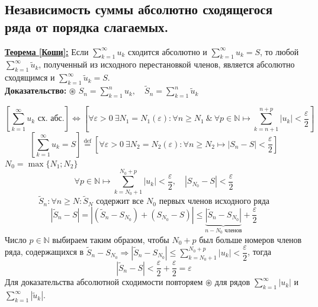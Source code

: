 \documentclass[a4paper,12pt]{article} %
\newcommand{\eqdef}{\stackrel{\mathrm{def}}{=}}
\newcommand{\N}{\mathbb{N}}
\newcommand{\useries}{\sum\limits_{k=1}^{\infty} u_k}
\newcommand{\auseries}{\sum\limits_{k=1}^{\infty} |u_k|}
\newcommand{\sn}{\sum\limits_{k=1}^{n} u_k}
\begin{document}
\subsection{Независимость суммы абсолютно сходящегося ряда от порядка слагаемых.}
\underline{\textbf{Теорема [Коши]:}}
Если $\useries$ сходится абсолютно и $\useries = S$, то любой $\sum\limits_{k=1}^{\infty} \tilde{u}_k$, полученный из исходного перестановкой членов, является абсолютно сходящимся и $\sum\limits_{k=1}^{\infty} \tilde{u}_k = S$.\\
\textbf{Доказательство:}
$\circledast$ $S_n = \sn, \hspace{1em} \tilde{S}_n = \sum\limits_{k=1}^{n} \tilde{u}_k$

\[\left[ \useries \text{ сх. абс.} \right] \Leftrightarrow \left[ \forall \varepsilon > 0 \ \exists N_1 = N_1(\varepsilon): \forall n \geqslant N_1 \ \& \ \forall p \in \N \mapsto \sum\limits_{k = n+1}^{n+p}|u_k| < \dfrac{\varepsilon}{2} \right] \]
\[ \left[ \useries = S \right] \eqdef \left[ \forall \varepsilon > 0 \ \exists N_2 = N_2(\varepsilon): \forall n \geqslant N_2 \mapsto \left| S_n - S \right| < \dfrac{\varepsilon}{2} \right] \]
$N_0 = \max \{ N_1; N_2 \}$
\[ \forall p \in \N \mapsto \sum\limits_{k = N_0 + 1}^{N_0 + p} |u_k| < \dfrac{\varepsilon}{2}, \hspace{1em} \left| S_{N_0} - S \right| < \dfrac{\varepsilon}{2} \]
\[\tilde{S}_n: \forall n \geqslant N: \tilde{S}_N \text{ содержит все } N_0 \text{ первых членов исходного ряда} \]
\[ |\tilde{S}_n - S| = |(\tilde{S}_n - S_{N_0}) + (S_{N_0} - S)| \leqslant \underbrace{|\tilde{S}_n - S_{N_0}|}_{n - N_0 \text{ членов}} + \dfrac{\varepsilon}{2} \]
Число $p \in \N$ выбираем таким образом, чтобы $N_0 + p$ был больше номеров членов ряда, содержащихся в $\tilde{S}_n - S_{N_0} \Rightarrow |\tilde{S}_n - S_{N_0}| \leqslant \sum\limits_{k=N_0 + 1}^{N_0 + p} |u_k| < \dfrac{\varepsilon}{2}$, тогда
\[ |\tilde{S}_n - S| < \dfrac{\varepsilon}{2} + \dfrac{\varepsilon}{2} = \varepsilon\]
Для доказательства абсолютной сходимости повторяем $\circledast$ для рядов $\auseries$ и $\sum\limits_{k=1}^{\infty}|\tilde{u}_k|$.
\end{document}
